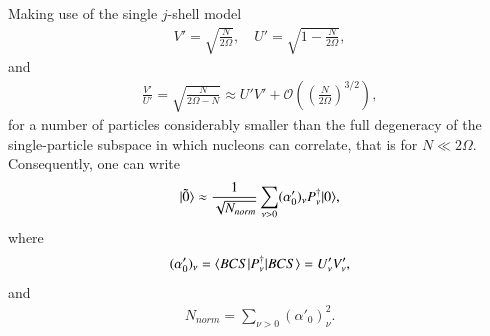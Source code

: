 \begin{subappendices}
Making use of the single $j$-shell model
\begin{align}\label{eq2App16Ex}
V'=\sqrt{\frac{N}{2\Omega}},\quad U'=\sqrt{1-\frac{N}{2\Omega}},
\end{align}
and
\begin{align}\label{eq2App17Ex}
\frac{V'}{U'}=\sqrt{\frac{N}{2\Omega-N}}\approx U'V'+\mathcal O\left(\left(\frac{N}{2\Omega}\right)^{3/2}\right),
\end{align}
for a number of particles considerably smaller than the full degeneracy of the single-particle subspace in which nucleons can correlate, that is for $N\ll2\Omega$. Consequently, one can write
\begin{align}\label{eq2App18Ex}
|{\tilde 0} \rangle\approx\frac{1}{\sqrt{ N_{norm}}}\sum_{\nu>0}(\alpha'_0)_\nu P^\dagger_\nu|{0} \rangle,
\end{align}
where
\begin{align}\label{eq2App19Ex}
(\alpha'_0)_\nu =\langle {BCS|P^\dagger_\nu|BCS} \rangle=U'_\nu V'_\nu,
\end{align}
and
\begin{align}\label{eq2App20Ex}
N_{norm}=\sum_{\nu>0}(\alpha'_0)_\nu^2.
\end{align}











\end{subappendices}















% 
%

